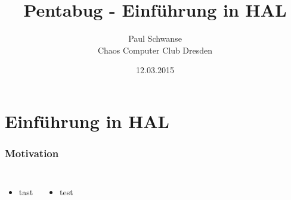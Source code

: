 \documentclass[12pt]{beamer}
\title{Pentabug - Einführung in HAL}
\author{\small Paul Schwanse \\\large Chaos Computer Club Dresden}
\date{12.03.2015}
\begin{document}
\maketitle

\section{Einführung in HAL}

\begin{frame}
    \frametitle{Motivation}
    \begin{columns}[T]
    \begin{itemize}
	    \item tast

    \end{itemize}
    \begin{itemize}
	    \item test
    \end{itemize}
    \end{columns}

\end{frame}
\end{document}
